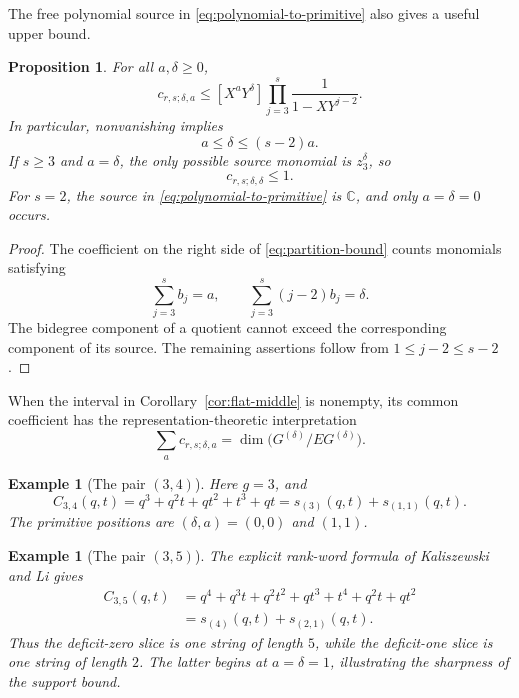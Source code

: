 \documentclass[11pt]{article}
\newtheorem{proposition}[theorem]{Proposition}
\newtheorem{example}[theorem]{Example}
\newcommand{\C}{\mathbb{C}}
\begin{document}
The free polynomial source in \eqref{eq:polynomial-to-primitive}
also gives a useful upper bound.

\begin{proposition}\label{prop:partition-bound}
For all $a,\delta\geq0$,
\begin{equation}\label{eq:partition-bound}
 c_{r,s;\delta,a}
 \leq
 [X^aY^\delta]
 \prod_{j=3}^s\frac1{1-XY^{j-2}}.
\end{equation}
In particular, nonvanishing implies
\begin{equation}\label{eq:two-sided-support}
 a\leq\delta\leq(s-2)a.
\end{equation}
If $s\geq3$ and $a=\delta$, the only possible source monomial is
$z_3^\delta$, so
\begin{equation}\label{eq:outer-multiplicity}
 c_{r,s;\delta,\delta}\leq1.
\end{equation}
For $s=2$, the source in \eqref{eq:polynomial-to-primitive} is
$\C$, and only $a=\delta=0$ occurs.
\end{proposition}

\begin{proof}
The coefficient on the right side of \eqref{eq:partition-bound}
counts monomials satisfying
\[
 \sum_{j=3}^s b_j=a,
 \qquad
 \sum_{j=3}^s(j-2)b_j=\delta.
\]
The bidegree component of a quotient cannot exceed the corresponding
component of its source.  The remaining assertions follow from
$1\leq j-2\leq s-2$.
\end{proof}

When the interval in Corollary~\ref{cor:flat-middle} is nonempty, its
common coefficient has the representation-theoretic interpretation
\begin{equation}\label{eq:common-middle}
 \sum_a c_{r,s;\delta,a}
 =\dim\bigl(G^{(\delta)}/EG^{(\delta)}\bigr).
\end{equation}

\begin{example}[The pair $(3,4)$]\label{ex:3-4}
Here $g=3$, and
\[
 C_{3,4}(q,t)
 =q^3+q^2t+qt^2+t^3+qt
 =s_{(3)}(q,t)+s_{(1,1)}(q,t).
\]
The primitive positions are $(\delta,a)=(0,0)$ and $(1,1)$.
\end{example}

\begin{example}[The pair $(3,5)$]\label{ex:3-5}
The explicit rank-word formula of Kaliszewski and Li
\cite{KaliszewskiLi} gives
\begin{align*}
 C_{3,5}(q,t)
 &=q^4+q^3t+q^2t^2+qt^3+t^4+q^2t+qt^2\\
 &=s_{(4)}(q,t)+s_{(2,1)}(q,t).
\end{align*}
Thus the deficit-zero slice is one string of length $5$, while the
deficit-one slice is one string of length $2$.  The latter begins at
$a=\delta=1$, illustrating the sharpness of the support bound.
\end{example}
\end{document}
